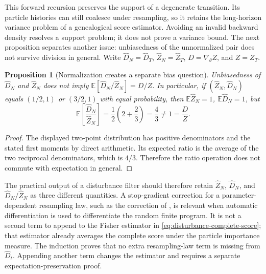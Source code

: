 \documentclass[11pt]{article}
\newtheorem{proposition}{Proposition}
\begin{document}
This forward recursion preserves the support of a degenerate transition.
Its particle histories can still coalesce under resampling, so it retains
the long-horizon variance problem of a genealogical score estimator.
Avoiding an invalid backward density resolves a support problem; it does not
prove a variance bound. The next proposition separates another issue:
unbiasedness of the unnormalized pair does not survive division in general.
Write $\widehat D_N=\widehat D_T$, $\widehat Z_N=\widehat Z_T$,
$D=\nabla_\theta Z$, and $Z=Z_T$.

\begin{proposition}[Normalization creates a separate bias question]
\label{prop:ratio-bias}
Unbiasedness of $\widehat D_N$ and $\widehat Z_N$ does not imply
$\mathbb E[\widehat D_N/\widehat Z_N]=D/Z$. In particular, if
$(\widehat Z_N,\widehat D_N)$ equals $(1/2,1)$ or $(3/2,1)$ with equal
probability, then $\mathbb E\widehat Z_N=1$, $\mathbb E\widehat D_N=1$, but
\begin{equation}
 \mathbb E\left[\frac{\widehat D_N}{\widehat Z_N}\right]
 =\frac12\left(2+\frac23\right)=\frac43\ne1
 =\frac{D}{Z}.
 \label{eq:ratio-bias-counterexample}
\end{equation}
\end{proposition}

\begin{proof}
The displayed two-point distribution has positive denominators and the stated
first moments by direct arithmetic. Its expected ratio is the average of the
two reciprocal denominators, which is $4/3$. Therefore the ratio operation
does not commute with expectation in general.
\end{proof}

The practical output of a disturbance filter should therefore retain
$\widehat Z_N$, $\widehat D_N$, and $\widehat D_N/\widehat Z_N$ as three
different quantities. A stop-gradient correction for a parameter-dependent
resampling law, such as the correction of
\citet[Section 3.1, equation (13)]{scibior2021dpf}, is relevant when automatic
differentiation is used to differentiate the random finite program. It is not
a second term to append to the Fisher estimator in
\eqref{eq:disturbance-complete-score}; that estimator already averages the
complete score under the particle importance measure. The induction proves
that no extra resampling-law term is missing from $\widehat D_t$.
Appending another term changes the estimator and requires a separate
expectation-preservation proof.
\end{document}
